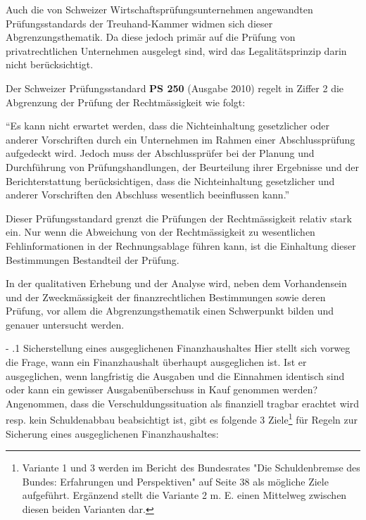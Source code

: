 \documentclass[10pt]{article}
\makeatletter
\renewcommand\paragraph{\@startsection{paragraph}{3}{0mm}{-\baselineskip}{.1\baselineskip}{\normalfont\normalsize\bfseries}}
\renewcommand\paragraph{%
\@startsection{paragraph}{3}{0mm}%
{-\baselineskip}%
{.1\baselineskip}%
{\normalfont\normalsize\bfseries}}
\makeatother
\begin{document}
Auch die von Schweizer Wirtschaftsprüfungsunternehmen angewandten Prüfungsstandards der Treuhand-Kammer widmen sich dieser Abgrenzungsthematik. Da diese jedoch primär auf die Prüfung von privatrechtlichen Unternehmen ausgelegt sind, wird das Legalitätsprinzip darin nicht berücksichtigt. 

Der Schweizer Prüfungsstandard \textbf{PS 250} (Ausgabe 2010) regelt in Ziffer 2 die Abgrenzung der Prüfung der Rechtmässigkeit wie folgt: 

“{}Es kann nicht erwartet werden, dass die Nichteinhaltung gesetzlicher oder anderer Vorschriften durch ein Unternehmen im Rahmen einer Abschlussprüfung aufgedeckt wird. Jedoch muss der Abschlussprüfer bei der Planung und Durchführung von Prüfungshandlungen, der Beurteilung ihrer Ergebnisse und der Berichterstattung berücksichtigen, dass die Nichteinhaltung gesetzlicher und anderer Vorschriften den Abschluss wesentlich beeinflussen kann.”{} 

Dieser Prüfungsstandard grenzt die Prüfungen der Rechtmässigkeit relativ stark ein. Nur wenn die Abweichung von der Rechtmässigkeit zu wesentlichen Fehlinformationen in der Rechnungsablage führen kann, ist die Einhaltung dieser Bestimmungen Bestandteil der Prüfung. 

In der qualitativen Erhebung und der Analyse wird, neben dem Vorhandensein und der Zweckmässigkeit der finanzrechtlichen Bestimmungen sowie deren Prüfung, vor allem die Abgrenzungsthematik einen Schwerpunkt bilden und genauer untersucht werden. 

\paragraph{Sicherstellung eines ausgeglichenen Finanzhaushaltes}\label{para:sicherstellung_eines_ausgeglichenen_finanzhaushaltes}
Hier stellt sich vorweg die Frage, wann ein Finanzhaushalt überhaupt ausgeglichen ist. Ist er ausgeglichen, wenn langfristig die Ausgaben und die Einnahmen identisch sind oder kann ein gewisser Ausgabenüberschuss in Kauf genommen werden? Angenommen, dass die Verschuldungssituation als finanziell tragbar erachtet wird resp. kein Schuldenabbau beabsichtigt ist, gibt es folgende 3 Ziele\footnote{Variante 1 und 3 werden im Bericht des Bundesrates "Die Schuldenbremse des Bundes: Erfahrungen und Perspektiven" auf Seite 38 als mögliche Ziele aufgeführt. Ergänzend stellt die Variante 2 m. E. einen Mittelweg zwischen diesen beiden Varianten dar. } für Regeln zur Sicherung eines ausgeglichenen Finanzhaushaltes: 
\end{document}
